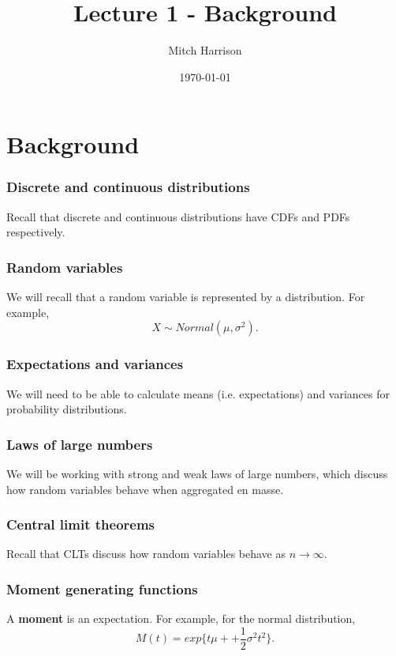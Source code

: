 \documentclass[titlepage, 12pt, leqno]{article}
\title{\Huge{Lecture 1 - Background}}
\author{\large{Mitch Harrison}}
\date{\today}
\begin{document}
\setlength{\parskip}{1\baselineskip}
\setlength{\parindent}{15pt}
\maketitle
\tableofcontents
\newpage


\section{Background}

\subsubsection{Discrete and continuous distributions}
Recall that discrete and continuous distributions have CDFs and PDFs 
respectively.

\subsubsection{Random variables}
We will recall that a random variable is represented by a distribution. For
example, 
\[
X \sim Normal(\mu, \sigma^{2}).
\]
\subsubsection{Expectations and variances}
We will need to be able to calculate means (i.e. expectations) and variances
for probability distributions.

\subsubsection{Laws of large numbers}
We will be working with strong and weak laws of large numbers, which discuss
how random variables behave when aggregated en masse.

\subsubsection{Central limit theorems}
Recall that CLTs discuss how random variables behave as $n \rightarrow \infty$.

\subsubsection{Moment generating functions}
A \textbf{moment} is an expectation. For example, for the normal distribution,
\[
    M(t) = exp\{t\mu + + \frac{1}{2}\sigma^{2}t^{2}\}.
\]
\end{document}
